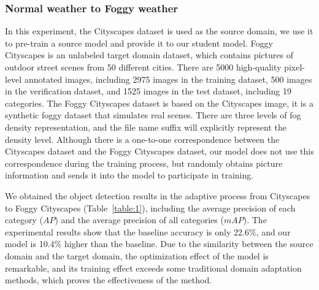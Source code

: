 \documentclass[sn-mathphys]{sn-jnl}%
\theoremstyle{thmstyleone}%
\theoremstyle{thmstyletwo}%
\theoremstyle{thmstylethree}%
\begin{document}
\subsubsection{Normal weather to Foggy weather} 
In this experiment, the Cityscapes\cite{cordts2016cityscapes} dataset is used as the source domain, we use it to pre-train a source model and provide it to our student model. Foggy Cityscapes\cite{sakaridis2018semantic} is an unlabeled target domain dataset, which contains pictures of outdoor street scenes from 50 different cities. There are 5000 high-quality pixel-level annotated images, including 2975 images in the training dataset, 500 images in the verification dataset, and 1525 images in the test dataset, including 19 categories. The Foggy Cityscapes dataset is based on the Cityscapes image, it is a synthetic foggy dataset that simulates real scenes. There are three levels of fog density representation, and the file name suffix will explicitly represent the density level. Although there is a one-to-one correspondence between the Cityscapes dataset and the Foggy Cityscapes dataset, our model does not use this correspondence during the training process, but randomly obtains picture information and sends it into the model to participate in training.

We obtained the object detection results in the adaptive process from Cityscapes to Foggy Cityscapes (Table~\ref{table:1}), including the average precision of each category ($AP$) and the average precision of all categories ($mAP$). The experimental results show that the baseline accuracy is only 22.6\%, and our model is 10.4\% higher than the baseline. Due to the similarity between the source domain and the target domain, the optimization effect of the model is remarkable, and its training effect exceeds some traditional domain adaptation methods, which proves the effectiveness of the method.
\end{document}
